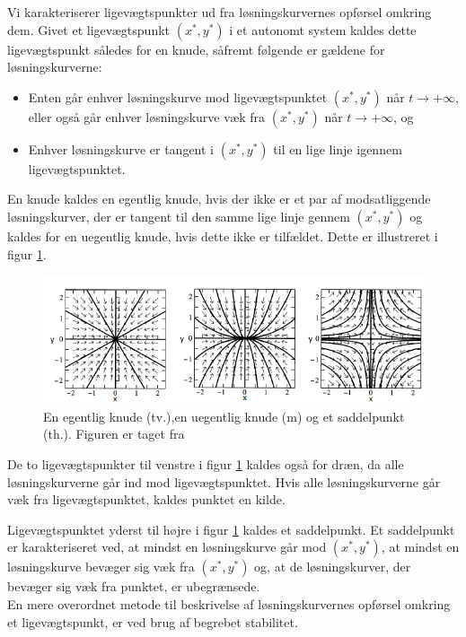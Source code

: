 \hfill \break
Vi karakteriserer ligevægtspunkter ud fra løsningskurvernes opførsel omkring dem. Givet et ligevægtspunkt $(x^*,y^*)$ i et autonomt system kaldes dette ligevægtspunkt således for en knude, såfremt følgende er gældene for løsningskurverne:
\begin{itemize}
    \item Enten går enhver løsningskurve mod ligevægtspunktet $(x^*,y^*)$ når $t \to + \infty$, eller også går enhver løsningskurve væk fra $(x^*,y^*)$ når $t \to + \infty$, og
    \item Enhver løsningskurve er tangent i $(x^*,y^*)$ til en lige linje igennem ligevægtspunktet.  
\end{itemize}
En knude kaldes en egentlig knude, hvis der ikke er et par af modsatliggende løsningskurver, der er tangent til den samme lige linje gennem $(x^*,y^*)$ og kaldes for en uegentlig knude, hvis dette ikke er tilfældet. Dette er illustreret i figur \ref{noder}.
\begin{figure} [H]
    \centering
    \includegraphics[scale=0.8]{Images/noder.png}
    \caption{En egentlig knude (tv.),en uegentlig knude (m) og et saddelpunkt (th.). Figuren er taget fra \citep[s. 491-492]{EP}}
    \label{noder}
\end{figure}

De to ligevægtspunkter til venstre i figur \ref{noder} kaldes også for dræn, da alle løsningskurverne går ind mod ligevægtspunktet. Hvis alle løsningskurverne går væk fra ligevægtspunktet, kaldes punktet en kilde.

Ligevægtspunktet yderst til højre i figur \ref{noder} kaldes et saddelpunkt. Et saddelpunkt er karakteriseret ved, at mindst en løsningskurve går mod $(x^*,y^*)$, at mindst en løsningskurve bevæger sig væk fra $(x^*,y^*)$ og, at de løsningskurver, der bevæger sig væk fra punktet, er ubegrænsede.
\\
En mere overordnet metode til beskrivelse af løsningskurvernes opførsel omkring et ligevægtspunkt, er ved brug af begrebet stabilitet.


